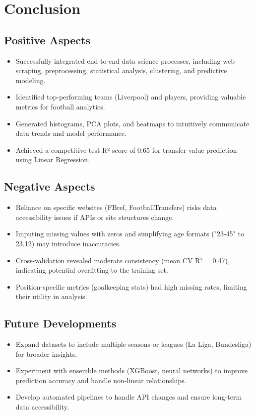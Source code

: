 \documentclass[12pt,a4paper]{report}
\begin{document}
\cleardoublepage  %

\section*{Conclusion}  %

\subsection*{Positive Aspects}
\begin{itemize}
    \item Successfully integrated end-to-end data science processes, including web scraping, preprocessing, statistical analysis, clustering, and predictive modeling.
    \item Identified top-performing teams (Liverpool) and players, providing valuable metrics for football analytics.
    \item Generated histograms, PCA plots, and heatmaps to intuitively communicate data trends and model performance.
    \item Achieved a competitive test R² score of 0.65 for transfer value prediction using Linear Regression.
\end{itemize}

\subsection*{Negative Aspects}
\begin{itemize}
    \item Reliance on specific websites (FBref, FootballTransfers) risks data accessibility issues if APIs or site structures change.
    \item Imputing missing values with zeros and simplifying age formats ("23-45" to 23.12) may introduce inaccuracies.
    \item Cross-validation revealed moderate consistency (mean CV R² = 0.47), indicating potential overfitting to the training set.
    \item Position-specific metrics (goalkeeping stats) had high missing rates, limiting their utility in analysis.
\end{itemize}

\subsection*{Future Developments}
\begin{itemize}
    \item Expand datasets to include multiple seasons or leagues (La Liga, Bundesliga) for broader insights.
    \item Experiment with ensemble methods (XGBoost, neural networks) to improve prediction accuracy and handle non-linear relationships.
    \item Develop automated pipelines to handle API changes and ensure long-term data accessibility.
\end{itemize}
\end{document}
